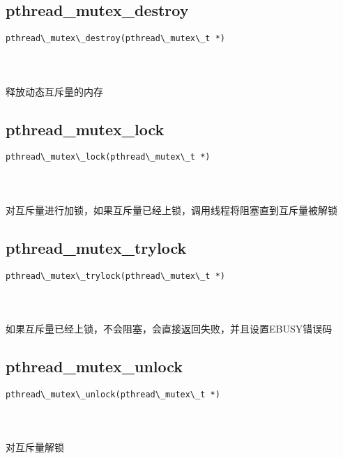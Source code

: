 \documentclass[10pt,a4paper]{article}
\begin{document}
\subsection{pthread\_mutex\_destroy}
\begin{spacing}{2.0}
\lstset{language=C,numbers=none}
\begin{lstlisting}
pthread\_mutex\_destroy(pthread\_mutex\_t *)
\end{lstlisting}
{\large\color[rgb]{0.2,0.4,0.6}{*:}}
\paragraph{ \ \ }释放动态互斥量的内存
\end{spacing}

\subsection{pthread\_mutex\_lock}
\begin{spacing}{2.0}
\lstset{language=C,numbers=none}
\begin{lstlisting}
pthread\_mutex\_lock(pthread\_mutex\_t *)
\end{lstlisting}
{\large\color[rgb]{0.2,0.4,0.6}{*:}}
\paragraph{ \ \ }对互斥量进行加锁，如果互斥量已经上锁，调用线程将阻塞直到互斥量被解锁
\end{spacing}

\subsection{pthread\_mutex\_trylock}
\begin{spacing}{2.0}
\lstset{language=C,numbers=none}
\begin{lstlisting}
pthread\_mutex\_trylock(pthread\_mutex\_t *)
\end{lstlisting}
{\large\color[rgb]{0.2,0.4,0.6}{*:}}
\paragraph{ \ \ }如果互斥量已经上锁，不会阻塞，会直接返回失败，并且设置EBUSY错误码
\end{spacing}

\subsection{pthread\_mutex\_unlock}
\begin{spacing}{2.0}
\lstset{language=C,numbers=none}
\begin{lstlisting}
pthread\_mutex\_unlock(pthread\_mutex\_t *)
\end{lstlisting}
{\large\color[rgb]{0.2,0.4,0.6}{*:}}
\paragraph{ \ \ }对互斥量解锁
\end{spacing}
\end{document}
